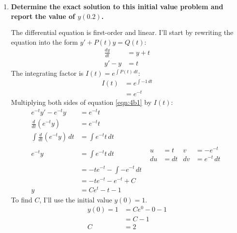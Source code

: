 \documentclass[11pt]{article}
\begin{document}
\begin{enumerate}[label={\textbf{\arabic*.}}]
{\begin{enumerate}[label={\textbf{(\alph*)}}]
{\begin{center}
                    \end{center}
                }
                \item{
                    \textbf{\boldmath Determine the exact solution to this initial value problem and report the value of $y(0.2)$.}
                    \par
                    The differential equation is first-order and linear. I'll start by rewriting the equation into the form $y'+P(t)y=Q(t)$:
                    \begin{align}
                        \frac{dy}{dt}&=y+t \nonumber \\
                        y'-y&=t \label{eqn:4b1}
                    \end{align}
                    The integrating factor is $I(t)=e^{\int P(t)\,dt}$:
                    \begin{align*}
                        I(t)&=e^{\int-1\,dt} \\
                        &=e^{-t}
                    \end{align*}
                    Multiplying both sides of equation \ref{eqn:4b1} by $I(t)$:
                    \begin{align}
                        e^{-t}y'-e^{-t}y&=e^{-t}t \nonumber \\
                        \frac{d}{dt}(e^{-t}y)&=e^{-t}t \nonumber \\
                        \int\frac{d}{dt}(e^{-t}y)\,dt&=\int e^{-t}t\,dt \nonumber \\
                        e^{-t}y&=\int e^{-t}t\,dt & \begin{aligned}u&=t & v&=-e^{-t} \\ du&=dt & dv&=e^{-t}\,dt\end{aligned} \nonumber \\
                        &=-te^{-t}-\int-e^{-t}\,dt \nonumber \\
                        &=-te^{-t}-e^{-t}+C \nonumber \\
                        y&=Ce^t-t-1 \label{eqn:4b2}
                    \end{align}
                    To find $C$, I'll use the initial value $y(0)=1$.
                    \begin{align*}
                        y(0)=1&=Ce^0-0-1 \\
                        &=C-1 \\
                        C&=2
                    \end{align*}
}
\end{enumerate}}
\end{enumerate}
\end{document}
